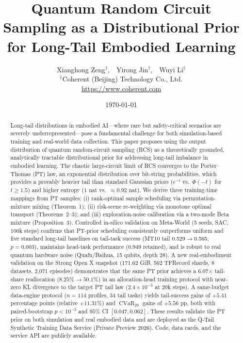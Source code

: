 \documentclass[10pt]{article}
\title{Quantum Random Circuit Sampling as a Distributional Prior for Long-Tail Embodied Learning}
\author{
  Xianghong Zeng$^\dagger$,~~Yirong Jin$^\dagger$,~~Wuyi Li$^\dagger$\\[4pt]
  \small $^\dagger$Coherent (Beijing) Technology Co., Ltd.\\
  \small \href{https://www.coherent.com}{https://www.coherent.com}
}
\date{\today}
\DeclareMathOperator{\CVaR}{CVaR}
\begin{document}
\maketitle

\begin{abstract}
Long-tail distributions in embodied AI---where rare but safety-critical scenarios are
severely underrepresented---pose a fundamental challenge for both simulation-based training
and real-world data collection.  This paper proposes using the output distribution of
quantum random-circuit sampling (RCS) as a theoretically grounded, analytically tractable
distributional prior for addressing long-tail imbalance in embodied learning.  The chaotic
large-circuit limit of RCS converges to the Porter--Thomas (PT) law, an exponential
distribution over bit-string probabilities, which provides a provably heavier tail than
standard Gaussian priors ($e^{-t}$ vs.\ $\Phi(-t)$ for $t\ge 1.5$) and higher entropy
($1$ nat vs.\ $\approx 0.92$ nat).  We derive three training-time mappings from PT samples:
(i) rank-optimal sample scheduling via permutation-mixture mixing (Theorem~1);
(ii) risk-scene re-weighting via monotone optimal transport (Theorems~2--3); and (iii) exploration-noise calibration via a two-mode Beta mixture
(Proposition~3).  Controlled in-silico validation on Meta-World (5 seeds, SAC, 100k steps)
confirms that PT-prior scheduling consistently outperforms uniform and five standard
long-tail baselines on tail-task success (MT10 tail 0.529$\rightarrow$0.565, $p=0.003$),
maintains head-task performance (0.949 retained), and is robust to real quantum hardware
noise (Quafu/Baihua, 15 qubits, depth 28).  A new real-embodiment validation on the Strong
Open X snapshot (171.62 GiB, 562 TFRecord shards, 8 datasets, 2,071 episodes) demonstrates
that the same PT prior achieves a 6.07$\times$ tail-share reallocation
($8.25\%\rightarrow50.1\%$) in an allocation-head training protocol with near-zero KL
divergence to the target PT tail law ($2.4\times10^{-5}$ at 20k steps).  A same-budget
data-engine protocol ($n=114$ profiles, 34 tail tasks) yields
tail-success gains of $+5.41$ percentage points (relative $+11.31\%$) and
$\CVaR_{20}$ gains of $+5.56$ pp, both with paired-bootstrap $p<10^{-3}$ and
$95\%$ CI $[0.047,0.062]$.  These results validate the PT prior on both simulation and
real embodied data and are deployed as the Q-Tail Synthetic Training Data Service
(Private Preview 2026).  Code, data cards, and the service API are publicly available.
\end{abstract}
\end{document}
